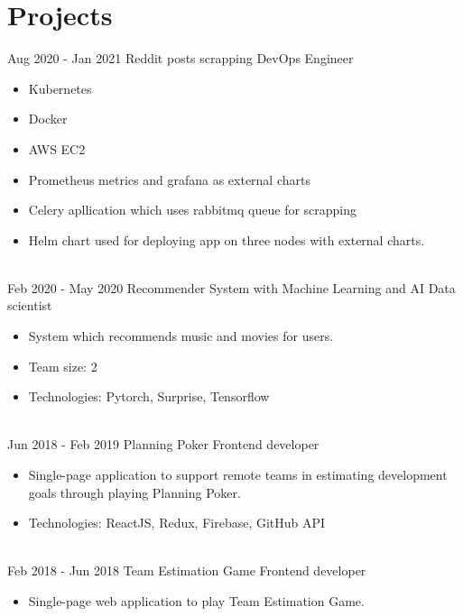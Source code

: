 \documentclass[letterpaper]{tenseconds} %
\begin{document}
\section{Projects}

\begin{twenty} %
	\twentyitem
	{Aug 2020 -}
	{Jan 2021}
	{Reddit posts scrapping \href{https://github.com/kk0walski/KubernetesScrapper}{\faGithub}}
	{DevOps Engineer}
	{}
	{\begin{itemize}
			\item Kubernetes
			\item Docker
			\item AWS EC2
			\item Prometheus metrics and grafana as external charts
			\item Celery apllication which uses rabbitmq queue for scrapping
			\item Helm chart used for deploying app on three nodes with external charts.
		\end{itemize}}
	\\
	\twentyitem
	{Feb 2020 -}
	{May 2020}
	{Recommender System with Machine Learning and AI \href{https://sundog-education.com/recsys/}{\faExternalLink}}
	{Data scientist}
	{}
	{\begin{itemize}
			\item System which recommends music and movies for users.
			\item Team size: 2
			\item Technologies: Pytorch, Surprise, Tensorflow
		\end{itemize}}
	\\
	\twentyitem
	{Jun 2018 -}
	{Feb 2019}
	{Planning Poker \href{https://github.com/kk0walski/PlanningPoker}{\faGithub}}
	{Frontend developer}
	{}
	{\begin{itemize}
			\item Single-page application to support remote teams in estimating development goals through playing Planning Poker.
			\item Technologies: ReactJS, Redux, Firebase, GitHub API
		\end{itemize}}
	\\
	\twentyitem
	{Feb 2018 -}
	{Jun 2018}
	{Team Estimation Game  \href{https://www.github.com/kk0walski/reactiveTeamEstimationGame}{\faGithub}}
	{Frontend developer}
	{}
	{\begin{itemize}
			\item Single-page web application to play Team Estimation Game.

\end{itemize}}
\end{twenty}
\end{document}
